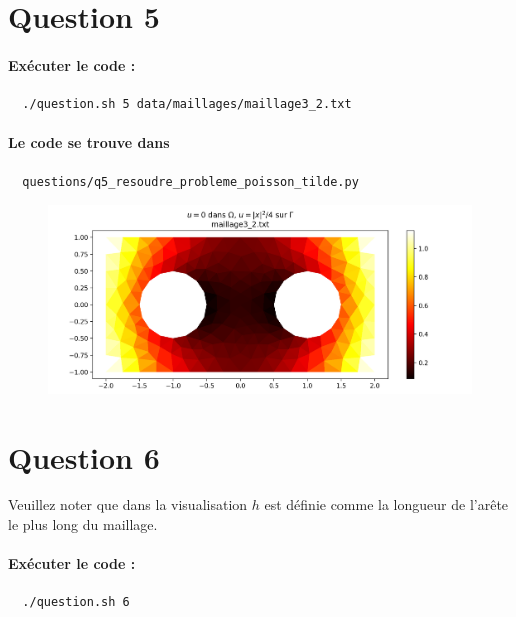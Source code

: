\documentclass[french, 12pt, a4paper]{article}
\begin{document}

\section*{Question 5}

\paragraph{Exécuter le code :}
\begin{verbatim}
  ./question.sh 5 data/maillages/maillage3_2.txt
\end{verbatim}

\paragraph{Le code se trouve dans}
\begin{verbatim}
  questions/q5_resoudre_probleme_poisson_tilde.py
\end{verbatim}

\begin{figure}[H]
\centering
\includegraphics[scale=0.6]{figure_5.png}
\end{figure}


\section*{Question 6}

Veuillez noter que dans la visualisation $h$ est définie comme la longueur de
l'arête le plus long du maillage.

\paragraph{Exécuter le code :}
\begin{verbatim}
  ./question.sh 6
\end{verbatim}
\end{document}

